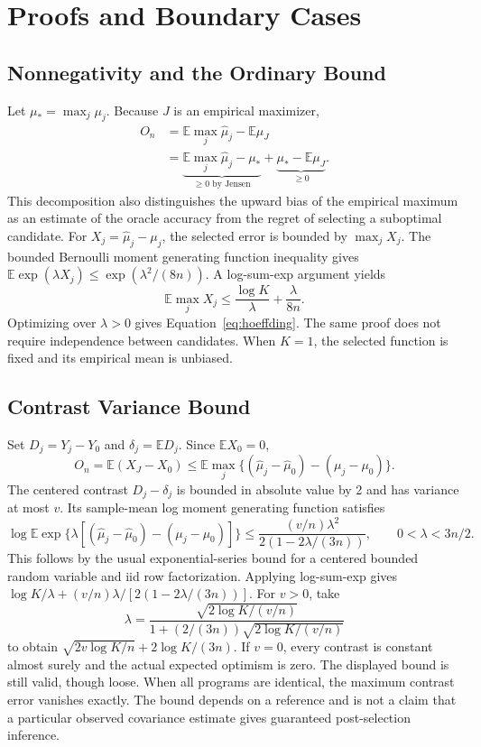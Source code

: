 \documentclass{article}
\newcommand{\E}{\mathbb{E}}
\newcommand{\muh}{\widehat\mu}
\begin{document}



\clearpage
\appendix
\onecolumn
\section{Proofs and Boundary Cases}\label{app:proofs}
\subsection{Nonnegativity and the Ordinary Bound}
Let $\mu_* =\max_j\mu_j$. Because $J$ is an empirical maximizer,
\begin{align*}
 O_n &=\E\max_j\muh_j-\E\mu_J\\
 &=\underbrace{\E\max_j\muh_j-\mu_*}_{\geq0\text{ by Jensen}}
   +\underbrace{\mu_*-\E\mu_J}_{\geq0}.
\end{align*}
This decomposition also distinguishes the upward bias of the empirical maximum as an estimate of the oracle accuracy from the regret of selecting a suboptimal candidate. For $X_j=\muh_j-\mu_j$, the selected error is bounded by $\max_jX_j$. The bounded Bernoulli moment generating function inequality gives $\E\exp(\lambda X_j)\leq\exp(\lambda^2/(8n))$. A log-sum-exp argument yields
\[
 \E\max_jX_j\leq\frac{\log K}{\lambda}+\frac{\lambda}{8n}.
\]
Optimizing over $\lambda>0$ gives Equation~\eqref{eq:hoeffding}. The same proof does not require independence between candidates. When $K=1$, the selected function is fixed and its empirical mean is unbiased.

\subsection{Contrast Variance Bound}
Set $D_j=Y_j-Y_0$ and $\delta_j=\E D_j$. Since $\E X_0=0$,
\[
 O_n=\E(X_J-X_0)\leq\E\max_j\{(\muh_j-\muh_0)-(\mu_j-\mu_0)\}.
\]
The centered contrast $D_j-\delta_j$ is bounded in absolute value by 2 and has variance at most $v$. Its sample-mean log moment generating function satisfies
\[
 \log\E\exp\{\lambda[(\muh_j-\muh_0)-(\mu_j-\mu_0)]\}
 \leq\frac{(v/n)\lambda^2}{2(1-2\lambda/(3n))},\qquad0<\lambda<3n/2.
\]
This follows by the usual exponential-series bound for a centered bounded random variable and iid row factorization. Applying log-sum-exp gives $\log K/\lambda+(v/n)\lambda/[2(1-2\lambda/(3n))]$. For $v>0$, take
\[
 \lambda=\frac{\sqrt{2\log K/(v/n)}}{1+(2/(3n))\sqrt{2\log K/(v/n)}}
\]
to obtain $\sqrt{2v\log K/n}+2\log K/(3n)$. If $v=0$, every contrast is constant almost surely and the actual expected optimism is zero. The displayed bound is still valid, though loose. When all programs are identical, the maximum contrast error vanishes exactly. The bound depends on a reference and is not a claim that a particular observed covariance estimate gives guaranteed post-selection inference.
\end{document}
